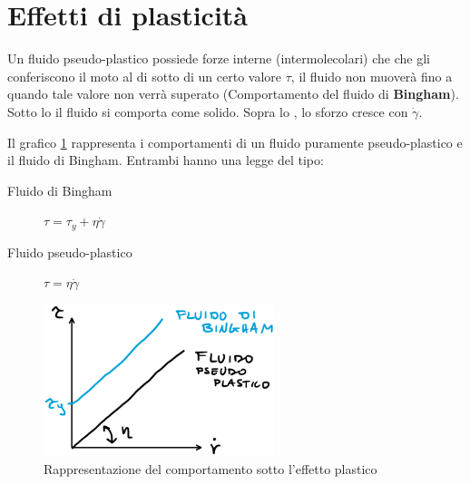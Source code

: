\section{Effetti di plasticità}
Un fluido pseudo-plastico possiede forze interne (intermolecolari) che che gli conferiscono il moto al di sotto di un certo valore $\tau$, il fluido non muoverà fino a quando tale valore non verrà superato (Comportamento del fluido di \textbf{Bingham}). 
Sotto lo  il fluido si comporta come solido.
Sopra lo , lo sforzo cresce con $\dot{\gamma}$.

Il grafico \ref{fig:EffettoPlastico} rappresenta i comportamenti di un fluido puramente pseudo-plastico e il fluido di Bingham.
Entrambi hanno una legge del tipo:
\begin{description}
\item[Fluido di Bingham] $\tau = \tau_y + \eta \dot{\gamma}$
\item[Fluido pseudo-plastico] $\tau = \eta \dot{\gamma}$
\end{description}

\begin{figure}
\centering
\includegraphics[width = 0.6\textwidth]{gfx/EffettoPlastico}
\caption{Rappresentazione del comportamento sotto l'effetto plastico}
\label{fig:EffettoPlastico}
\end{figure}

